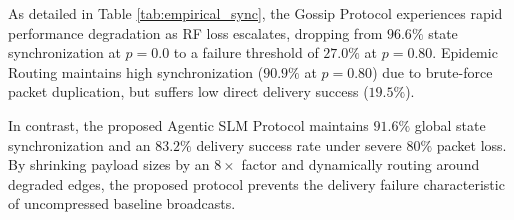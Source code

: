 \begin{table}[h]
\centering
\caption{Empirical State Synchronization (\%) and Delivery Rate (\%) Across RF Drop Rates}
\label{tab:empirical_sync}
\end{table}

As detailed in Table \ref{tab:empirical_sync}, the Gossip Protocol experiences rapid performance degradation as RF loss escalates, dropping from $96.6\%$ state synchronization at $p=0.0$ to a failure threshold of $27.0\%$ at $p=0.80$. Epidemic Routing maintains high synchronization ($90.9\%$ at $p=0.80$) due to brute-force packet duplication, but suffers low direct delivery success ($19.5\%$). 

In contrast, the proposed Agentic SLM Protocol maintains $91.6\%$ global state synchronization and an $83.2\%$ delivery success rate under severe $80\%$ packet loss. By shrinking payload sizes by an $8\times$ factor and dynamically routing around degraded edges, the proposed protocol prevents the delivery failure characteristic of uncompressed baseline broadcasts.

